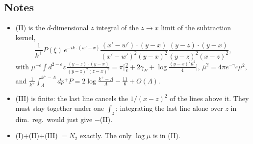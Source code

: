 \documentclass[10pt]{article}
\begin{document}
\subsection*{Notes}
\begin{itemize}
\item (II) is the $d$-dimensional $z$ integral of the $z\to x$ limit of the subtraction kernel,
\[\frac{1}{k^{+}}P(\xi)\,e^{-ik\cdot(w'-x)}\frac{(x'-w')\cdot(y-x)}{(x'-w')^{2}(y-x)^{2}}\frac{(y-z)\cdot(y-x)}{(y-z)^{2}(x-z)^{2}},\] with
$\mu^{-\epsilon}\!\int d^{2-\epsilon}z\,\frac{(y-z)\cdot(y-x)}{(y-z)^{2}(z-x)^{2}}=\pi\big[\frac{2}{\epsilon}+2\gamma_{E}+\log\frac{(y-x)^{2}\bar\mu^{2}}{4}\big]$, $\bar\mu^{2}=4\pi e^{-\gamma_{E}}\mu^{2}$, and $\frac{1}{k^{+}}\int_{\Lambda}^{k^{+}-\Lambda}dp^{+}P=2\log\frac{k^{+}-\Lambda}{\Lambda}-\frac{11}{6}+O(\Lambda)$.
\item (III) is finite: the last line cancels the $1/(x-z)^{2}$ of the lines above it. They must stay together under one $\int_{z}$; integrating the last line alone over $z$ in dim.~reg.\ would just give $-$(II).
\item (I)+(II)+(III) $=N_{2}$ exactly. The only $\log\mu$ is in (II).
\end{itemize}
\end{document}
